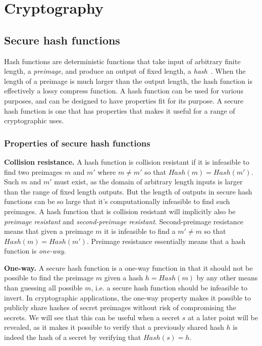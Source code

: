 \section{Cryptography}
\label{sec:cryptography}

\subsection{Secure hash functions}

Hash functions are deterministic functions that take input of arbitrary finite length, a \emph{preimage}, and produce an output of fixed length, a \emph{hash}~\cite[p.~153]{lindell2014introduction}. When the length of a preimage is much larger than the output length, the hash function is effectively a lossy compress function. A hash function can be used for various purposes, and can be designed to have properties fit for its purpose. A secure hash function is one that has properties that makes it useful for a range of cryptographic uses. 

\subsubsection{Properties of secure hash functions}

\noindent
{\bf Collision resistance.}
A hash function is collision resistant if it is infeasible to find two preimages $m$ and $m'$ where $m \neq m'$ so that $Hash(m) = Hash(m')$. Such $m$ and $m'$ must exist, as the domain of arbitrary length inputs is larger than the range of fixed length outputs. But the length of outputs in secure hash functions can be so large that it's computationally infeasible to find such preimages. 
A hash function that is collision resistant will implicitly also be \emph{preimage resistant} and \emph{second-preimage resistant}. Second-preimage resistance means that given a preimage $m$ it is infeasible to find a $m' \neq m$ so that $Hash(m) = Hash(m')$. Preimage resistance essentially means that a hash function is \emph{one-way}.

\noindent
{\bf One-way.}
A secure hash function is a one-way function in that it should not be possible to find the preimage $m$ given a hash $h = Hash(m)$ by any other means than guessing all possible $m$, i.e. a secure hash function should be infeasible to invert. In cryptographic applications, the one-way property makes it possible to publicly share hashes of secret preimages without risk of compromising the secrets. We will see that this can be useful when a secret $s$ at a later point will be revealed, as it makes it possible to verify that a previously shared hash $h$ is indeed the hash of a secret by verifying that $Hash(s) = h$.

